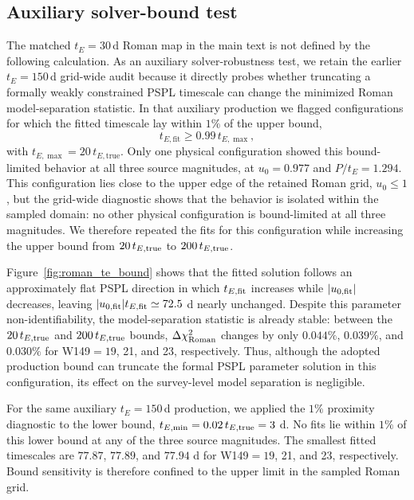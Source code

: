 \documentclass{article}
\begin{document}
\subsection{Auxiliary solver-bound test}
\label{app:roman_te_bound}

The matched $t_E=30\,$d Roman map in the main text is not defined by the
following calculation. As an auxiliary solver-robustness test, we retain
the earlier $t_E=150\,$d grid-wide audit because it directly probes
whether truncating a formally weakly constrained PSPL timescale can
change the minimized Roman model-separation statistic. In that auxiliary
production we flagged configurations for which the fitted timescale lay
within $1\%$ of the upper bound,
\begin{equation}
t_{E,\mathrm{fit}}\geq0.99\,t_{E,\max},
\end{equation}
with $t_{E,\max}=20\,t_{E,\mathrm{true}}$. Only one physical
configuration showed this bound-limited behavior at all three source
magnitudes, at $u_0=0.977$ and $P/t_E=1.294$. This configuration lies
close to the upper edge of the retained Roman grid, $u_0\leq1$, but the
grid-wide diagnostic shows that the behavior is isolated within the
sampled domain: no other physical configuration is bound-limited at all
three magnitudes. We therefore repeated the fits for this configuration
while increasing the upper bound from $20\,t_{E,\rm true}$ to
$200\,t_{E,\rm true}$.

Figure~\ref{fig:roman_te_bound} shows that the fitted solution follows
an approximately flat PSPL direction in which $t_{E,\rm fit}$ increases
while $|u_{0,\rm fit}|$ decreases, leaving
$|u_{0,\rm fit}|t_{E,\rm fit}\simeq72.5$ d nearly unchanged. Despite
this parameter non-identifiability, the model-separation statistic is
already stable: between the $20\,t_{E,\rm true}$ and
$200\,t_{E,\rm true}$ bounds, $\Delta\chi^2_{\rm Roman}$ changes by only
$0.044\%$, $0.039\%$, and $0.030\%$ for W149$=19$, 21, and 23,
respectively. Thus, although the adopted production bound can truncate
the formal PSPL parameter solution in this configuration, its effect on
the survey-level model separation is negligible.

For the same auxiliary $t_E=150\,$d production, we applied the
$1\%$ proximity diagnostic to the lower bound,
$t_{E,\min}=0.02\,t_{E,\rm true}=3$ d. No fits lie
within $1\%$ of this lower bound at any of the three source magnitudes.
The smallest fitted timescales are $77.87$, $77.89$, and $77.94$ d for
W149$=19$, 21, and 23, respectively. Bound sensitivity is therefore
confined to the upper limit in the sampled Roman grid.
\end{document}
